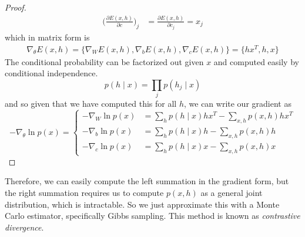 \begin{proof}
\begin{align}
        \bigg( \frac{\partial E(x, h)}{\partial c} \bigg)_j & = \frac{\partial E(x, h)}{\partial c_j} = x_j 
      \end{align}  
      which in matrix form is 
      \begin{align}
        \nabla_{\theta} E(x, h) = \{ \nabla_W E(x, h), \nabla_b E(x, h), \nabla_c E(x, h) \} = \{ h x^T, h, x \}
      \end{align}
      The conditional probability can be factorized out given $x$ and computed easily by conditional independence. 
      \begin{equation}
        p(h \mid x) = \prod_j p(h_j \mid x)
      \end{equation}
      and so given that we have computed this for all $h$, we can write our gradient as 
      \begin{equation}
        -\nabla_\theta \ln{p(x)} = \begin{cases}
          - \nabla_W \ln{p(x)} & = \sum_h p(h \mid x) h x^T - \sum_{x, h} p(x, h) h x^T \\
          - \nabla_b \ln{p(x)} & =  \sum_h p(h \mid x) h - \sum_{x, h} p(x, h) h \\
          - \nabla_c \ln{p(x)} & =  \sum_h p(h \mid x) x - \sum_{x, h} p(x, h) x
        \end{cases}
      \end{equation}
    \end{proof} 

    Therefore, we can easily compute the left summation in the gradient form, but the right summation requires us to compute $p(x, h)$ as a general joint distribution, which is intractable. So we just approximate this with a Monte Carlo estimator, specifically Gibbs sampling. This method is known as \textit{contrastive divergence}. 

